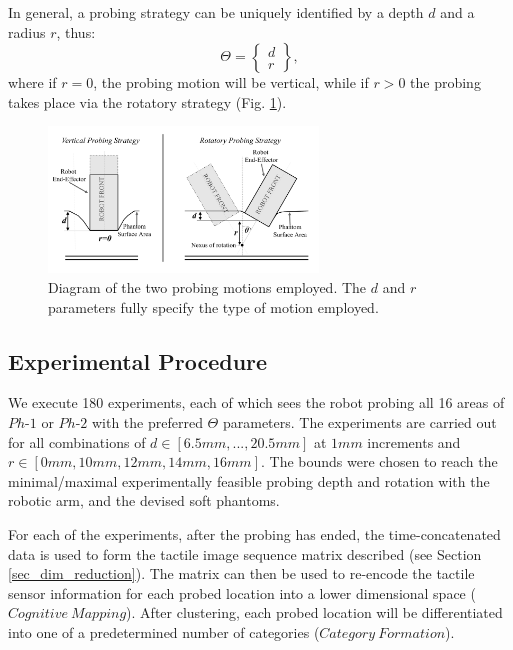\documentclass[]{interact}
\theoremstyle{plain}%
\theoremstyle{definition}
\theoremstyle{remark}
\begin{document}
In general, a probing strategy can be uniquely identified by a depth $d$ and a radius $r$, thus:
\begin{equation}
 \Theta = \begin{Bmatrix}d\\ r\end{Bmatrix},
\end{equation} 
where if $r=0$, the probing motion will be vertical, while if $r>0$ the probing takes place via the 
rotatory strategy (Fig. \ref{probing}).


\begin{figure}[]
	\centering
	\includegraphics[width=0.64\textwidth]{./figs/motion_diagram}
	\caption{Diagram of the two probing motions employed. The $d$ and $r$ parameters fully specify 
		the type of motion employed.}
	\label{probing}
\end{figure}


\subsection{Experimental Procedure} \label{sec_overall_approach}
We execute 180 experiments, each of which sees the robot probing all 16 areas of $Ph\text{-}1$ or $Ph\text{-}2$ with the 
preferred $\Theta$ parameters. The experiments are carried out for all combinations of $d\in[6.5mm, ... , 20.5mm]$ at $1mm$
increments and $r\in[0mm, 10mm, 12mm, 14mm, 16mm]$. The bounds were chosen to reach the minimal/maximal experimentally 
feasible probing depth and rotation with the robotic arm, and the devised soft phantoms. 

For each of the experiments, after the probing has ended, the time-concatenated data is used to form the tactile 
image sequence matrix described (see Section \ref{sec_dim_reduction}). The matrix can then be used to re-encode the
tactile sensor information for each probed location into a lower dimensional space ($Cognitive\ Mapping$). After clustering, each probed location will be differentiated into one of a predetermined number of categories ($Category\ Formation$).
\end{document}
